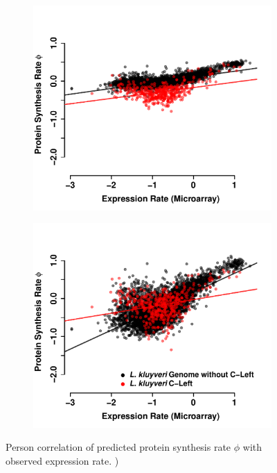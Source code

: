 \documentclass[12pt]{article}
\begin{document}
\begin{figure}[H]
    \centering
    \begin{subfigure}
        \centering
        \includegraphics[width=.45\textwidth]{img/phi_corr_plot_whole_Genome_estim.pdf}
    \end{subfigure}
    \begin{subfigure}
        \centering
        \includegraphics[width=.45\textwidth]{img/phi_corr_plot_split_Genome_estim.pdf}
    \end{subfigure}
    \caption{Person correlation of predicted protein synthesis rate $\phi$ with observed expression rate. )}
    \label{fig:phi_corr_two_cond}
\end{figure}
\end{document}
